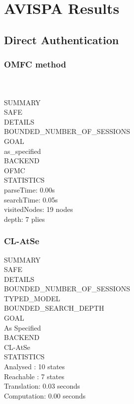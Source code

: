 \chapter{AVISPA Results}
\label{appendix:AVISPA_results}

\section{Direct Authentication}

\subsection{OMFC method}
\color{lstgrey}{\% OFMC}\\
\color{lstgrey}{\% Version of 2006/02/13}\\
\color{black}
SUMMARY\\
SAFE\\
\linebreak
DETAILS\\
BOUNDED\_NUMBER\_OF\_SESSIONS\\
\linebreak
GOAL\\
as\_specified\\
\linebreak
BACKEND\\
OFMC\\
\linebreak
STATISTICS\\
parseTime: 0.00s\\
searchTime: 0.05s\\
visitedNodes: 19 nodes\\
depth: 7 plies\\

\subsection{CL-AtSe}
SUMMARY\\
SAFE\\
\linebreak
DETAILS\\
BOUNDED\_NUMBER\_OF\_SESSIONS\\
TYPED\_MODEL\\
BOUNDED\_SEARCH\_DEPTH \\
\linebreak
GOAL\\
As Specified\\
\linebreak
BACKEND\\
CL-AtSe\\
\linebreak
STATISTICS\\
Analysed   : 10 states\\
Reachable  : 7 states\\
Translation: 0.03 seconds\\
Computation: 0.00 seconds\\

